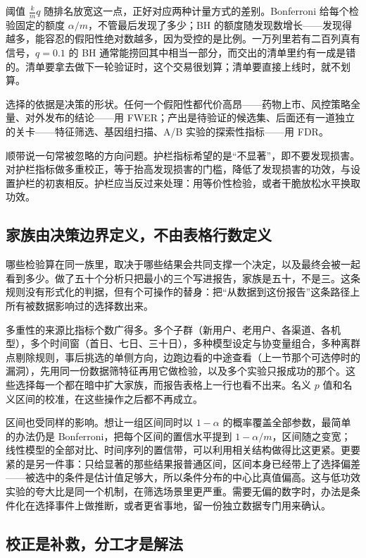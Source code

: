 阈值 \(\frac{k}{m}q\) 随排名放宽这一点，正好对应两种计量方式的差别。Bonferroni 给每个检验固定的额度 \(\alpha/m\)，不管最后发现了多少；BH 的额度随发现数增长——发现得越多，能容忍的假阳性绝对数越多，因为受控的是比例。一万列里若有二百列真有信号，\(q=0.1\) 的 BH 通常能捞回其中相当一部分，而交出的清单里约有一成是错的。清单要拿去做下一轮验证时，这个交易很划算；清单要直接上线时，就不划算。

选择的依据是决策的形状。任何一个假阳性都代价高昂——药物上市、风控策略全量、对外发布的结论——用 FWER；产出是待验证的候选集、后面还有一道独立的关卡——特征筛选、基因组扫描、A/B 实验的探索性指标——用 FDR。

顺带说一句常被忽略的方向问题。护栏指标希望的是``不显著''，即不要发现损害。对护栏指标做多重校正，等于抬高发现损害的门槛，降低了发现损害的功效，与设置护栏的初衷相反。护栏应当反过来处理：用等价性检验，或者干脆放松水平换取功效。

\subsection{家族由决策边界定义，不由表格行数定义}

哪些检验算在同一族里，取决于哪些结果会共同支撑一个决定，以及最终会被一起看到多少。做了五十个分析只把最小的三个写进报告，家族是五十，不是三。这条规则没有形式化的判据，但有个可操作的替身：把``从数据到这份报告''这条路径上所有被数据影响过的选择数出来。

多重性的来源比指标个数广得多。多个子群（新用户、老用户、各渠道、各机型），多个时间窗（首日、七日、三十日），多种模型设定与协变量组合，多种离群点剔除规则，事后挑选的单侧方向，边跑边看的中途查看（上一节那个可选停时的漏洞），先用同一份数据筛特征再用它做检验，以及多个实验只报成功的那个。这些选择每一个都在暗中扩大家族，而报告表格上一行也看不出来。名义 \(p\) 值和名义区间的校准，在这些操作之后都不再成立。

区间也受同样的影响。想让一组区间同时以 \(1-\alpha\) 的概率覆盖全部参数，最简单的办法仍是 Bonferroni，把每个区间的置信水平提到 \(1-\alpha/m\)，区间随之变宽；线性模型的全部对比、时间序列的置信带，可以利用相关结构做得比这更紧。更要紧的是另一件事：只给显著的那些结果报普通区间，区间本身已经带上了选择偏差——被选中的条件是估计值足够大，所以条件分布的中心比真值偏高。这与低功效实验的夸大比是同一个机制，在筛选场景里更严重。需要无偏的数字时，办法是条件化在选择事件上做推断，或者更省事地，留一份独立数据专门用来确认。

\subsection{校正是补救，分工才是解法}

